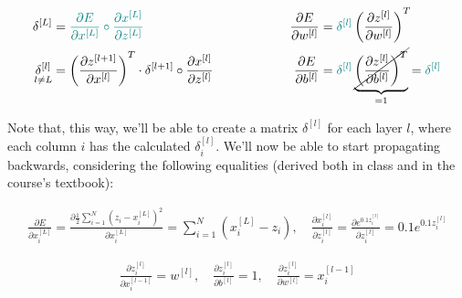 \documentclass[12pt]{article}
\begin{document}
\begin{enumerate}[leftmargin=\labelsep]
\begin{enumerate}
                \begin{equation*}
                  \begin{aligned}
                    \delta^{[L]}                        & = \textcolor{teal}{\frac{\partial E}{\partial x^{[L]}} \circ \frac{\partial x^{[L]}}{\partial z^{[L]}}}                                                & \qquad & \qquad &
                    \frac{\partial E}{\partial w^{[l]}} & = \textcolor{teal}{\delta^{[l]}} \left(\frac{\partial z^{[l]}}{\partial w^{[l]}}\right)^T                                                                                  \\
                    \underset{l \neq L}{\delta^{[l]}}   & = \left(\frac{\partial z^{[l + 1]}}{\partial x^{[l]}}\right)^T \cdot \delta^{[l + 1]} \circ \frac{\partial x^{[l]}}{\partial z^{[l]}}                  & \qquad & \qquad &
                    \frac{\partial E}{\partial b^{[l]}} & = \textcolor{teal}{\delta^{[l]}} \underbrace{\cancel{\left(\frac{\partial z^{[l]}}{\partial b^{[l]}}\right)^T}}_{= 1} = \textcolor{teal}{\delta^{[l]}}
                  \end{aligned}
                \end{equation*}

                Note that, this way, we'll be able to create a matrix $\delta^{[l]}$ for each
                layer $l$, where each column $i$ has the calculated $\delta_i^{[l]}$.
                We'll now be able to start propagating backwards, considering the following equalities
                (derived both in class and in the course's textbook):


                \begin{equation*}
                  \begin{aligned}
                    \frac{\partial E}{\partial x_i^{[L]}} = \frac{\partial \frac{1}{2}\sum_{i=1}^N (z_i - x_i^{[L]})^2}{\partial x_i^{[L]}} = \sum_{i=1}^N (x_i^{[L]} - z_i), \quad
                    \frac{\partial x_i^{[l]}}{\partial z_i^{[l]}} = \frac{\partial e^{0.1z_i^{[l]}}}{\partial z_i^{[l]}} = 0.1e^{0.1z_i^{[l]}}
                  \end{aligned}
                \end{equation*}

                \begin{equation*}
                  \begin{aligned}
                    \frac{\partial z_i^{[l]}}{\partial x_i^{[l - 1]}} = w^{[l]}, \quad
                    \frac{\partial z_i^{[l]}}{\partial b^{[l]}} = 1, \quad
                    \frac{\partial z_i^{[l]}}{\partial w^{[l]}} = x_i^{[l - 1]}
                  \end{aligned}
                \end{equation*}


\end{enumerate}
\end{enumerate}
\end{document}
